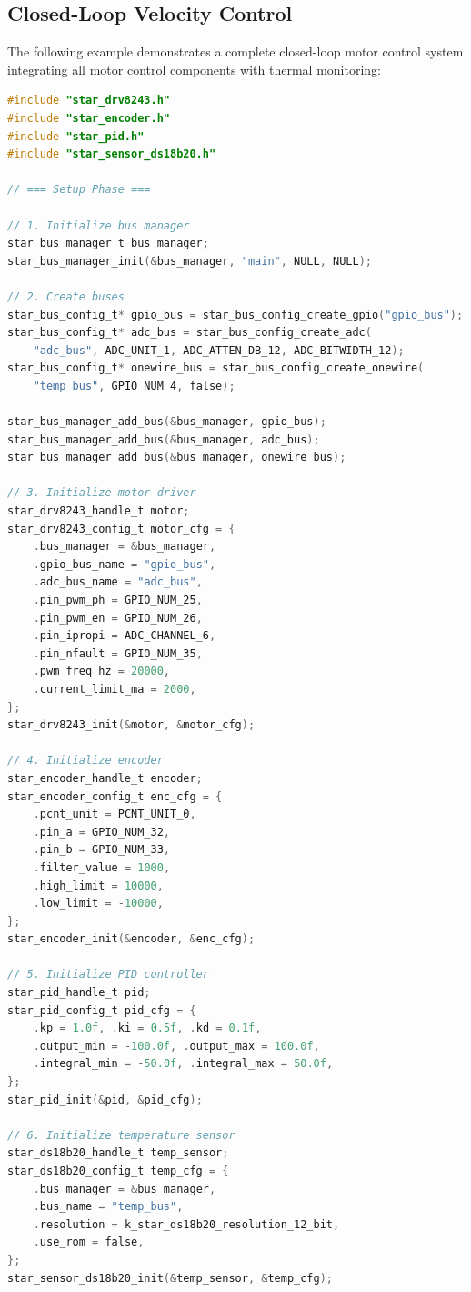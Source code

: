 \documentclass[11pt,letterpaper]{article}
\begin{document}
\subsection{Closed-Loop Velocity Control}

The following example demonstrates a complete closed-loop motor control system integrating all motor control components with thermal monitoring:

\begin{lstlisting}[language=C, caption=Complete Motor Control System]
#include "star_drv8243.h"
#include "star_encoder.h"
#include "star_pid.h"
#include "star_sensor_ds18b20.h"

// === Setup Phase ===

// 1. Initialize bus manager
star_bus_manager_t bus_manager;
star_bus_manager_init(&bus_manager, "main", NULL, NULL);

// 2. Create buses
star_bus_config_t* gpio_bus = star_bus_config_create_gpio("gpio_bus");
star_bus_config_t* adc_bus = star_bus_config_create_adc(
    "adc_bus", ADC_UNIT_1, ADC_ATTEN_DB_12, ADC_BITWIDTH_12);
star_bus_config_t* onewire_bus = star_bus_config_create_onewire(
    "temp_bus", GPIO_NUM_4, false);

star_bus_manager_add_bus(&bus_manager, gpio_bus);
star_bus_manager_add_bus(&bus_manager, adc_bus);
star_bus_manager_add_bus(&bus_manager, onewire_bus);

// 3. Initialize motor driver
star_drv8243_handle_t motor;
star_drv8243_config_t motor_cfg = {
    .bus_manager = &bus_manager,
    .gpio_bus_name = "gpio_bus",
    .adc_bus_name = "adc_bus",
    .pin_pwm_ph = GPIO_NUM_25,
    .pin_pwm_en = GPIO_NUM_26,
    .pin_ipropi = ADC_CHANNEL_6,
    .pin_nfault = GPIO_NUM_35,
    .pwm_freq_hz = 20000,
    .current_limit_ma = 2000,
};
star_drv8243_init(&motor, &motor_cfg);

// 4. Initialize encoder
star_encoder_handle_t encoder;
star_encoder_config_t enc_cfg = {
    .pcnt_unit = PCNT_UNIT_0,
    .pin_a = GPIO_NUM_32,
    .pin_b = GPIO_NUM_33,
    .filter_value = 1000,
    .high_limit = 10000,
    .low_limit = -10000,
};
star_encoder_init(&encoder, &enc_cfg);

// 5. Initialize PID controller
star_pid_handle_t pid;
star_pid_config_t pid_cfg = {
    .kp = 1.0f, .ki = 0.5f, .kd = 0.1f,
    .output_min = -100.0f, .output_max = 100.0f,
    .integral_min = -50.0f, .integral_max = 50.0f,
};
star_pid_init(&pid, &pid_cfg);

// 6. Initialize temperature sensor
star_ds18b20_handle_t temp_sensor;
star_ds18b20_config_t temp_cfg = {
    .bus_manager = &bus_manager,
    .bus_name = "temp_bus",
    .resolution = k_star_ds18b20_resolution_12_bit,
    .use_rom = false,
};
star_sensor_ds18b20_init(&temp_sensor, &temp_cfg);


\end{lstlisting}
\end{document}
